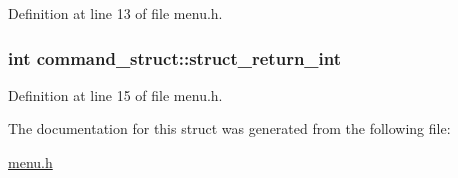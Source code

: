 Definition at line 13 of file menu.\-h.

\hypertarget{structcommand__struct_a4ffa2587b5988c5ed69bde2ef37475c0}{
\subsubsection[{struct\-\_\-return\-\_\-int}]{\setlength{\rightskip}{0pt plus 5cm}int command\-\_\-struct\-::struct\-\_\-return\-\_\-int}}\label{structcommand__struct_a4ffa2587b5988c5ed69bde2ef37475c0}


Definition at line 15 of file menu.\-h.



The documentation for this struct was generated from the following file\-:\begin{DoxyCompactItemize}
\item 
\hyperlink{menu_8h}{menu.\-h}\end{DoxyCompactItemize}
